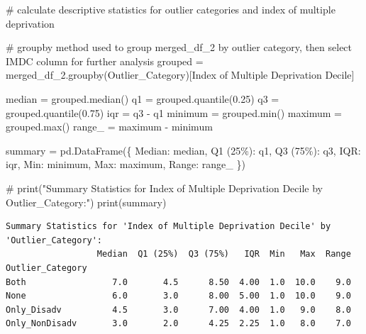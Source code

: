 \documentclass[
  letterpaper,
  DIV=11,
  numbers=noendperiod]{scrartcl}
\newenvironment{Shaded}{\begin{snugshade}}{\end{snugshade}}
\newcommand{\BuiltInTok}[1]{\textcolor[rgb]{0.00,0.23,0.31}{#1}}
\newcommand{\CommentTok}[1]{\textcolor[rgb]{0.37,0.37,0.37}{#1}}
\newcommand{\FloatTok}[1]{\textcolor[rgb]{0.68,0.00,0.00}{#1}}
\newcommand{\NormalTok}[1]{\textcolor[rgb]{0.00,0.23,0.31}{#1}}
\newcommand{\OperatorTok}[1]{\textcolor[rgb]{0.37,0.37,0.37}{#1}}
\newcommand{\StringTok}[1]{\textcolor[rgb]{0.13,0.47,0.30}{#1}}
\begin{document}
\begin{Shaded}
\begin{Highlighting}[]
\CommentTok{\#  calculate descriptive statistics for outlier categories and index of multiple deprivation}

\CommentTok{\# groupby method used to group merged\_df\_2 by outlier category, then select IMDC column for further analysis}
\NormalTok{grouped }\OperatorTok{=}\NormalTok{ merged\_df\_2.groupby(}\StringTok{\textquotesingle{}Outlier\_Category\textquotesingle{}}\NormalTok{)[}\StringTok{\textquotesingle{}Index of Multiple Deprivation Decile\textquotesingle{}}\NormalTok{]}


\NormalTok{median }\OperatorTok{=}\NormalTok{ grouped.median()}
\NormalTok{q1 }\OperatorTok{=}\NormalTok{ grouped.quantile(}\FloatTok{0.25}\NormalTok{)}
\NormalTok{q3 }\OperatorTok{=}\NormalTok{ grouped.quantile(}\FloatTok{0.75}\NormalTok{)}
\NormalTok{iqr }\OperatorTok{=}\NormalTok{ q3 }\OperatorTok{{-}}\NormalTok{ q1}
\NormalTok{minimum }\OperatorTok{=}\NormalTok{ grouped.}\BuiltInTok{min}\NormalTok{()}
\NormalTok{maximum }\OperatorTok{=}\NormalTok{ grouped.}\BuiltInTok{max}\NormalTok{()}
\NormalTok{range\_ }\OperatorTok{=}\NormalTok{ maximum }\OperatorTok{{-}}\NormalTok{ minimum}


\NormalTok{summary }\OperatorTok{=}\NormalTok{ pd.DataFrame(\{}
    \StringTok{\textquotesingle{}Median\textquotesingle{}}\NormalTok{: median,}
    \StringTok{\textquotesingle{}Q1 (25\%)\textquotesingle{}}\NormalTok{: q1,}
    \StringTok{\textquotesingle{}Q3 (75\%)\textquotesingle{}}\NormalTok{: q3,}
    \StringTok{\textquotesingle{}IQR\textquotesingle{}}\NormalTok{: iqr,}
    \StringTok{\textquotesingle{}Min\textquotesingle{}}\NormalTok{: minimum,}
    \StringTok{\textquotesingle{}Max\textquotesingle{}}\NormalTok{: maximum,}
    \StringTok{\textquotesingle{}Range\textquotesingle{}}\NormalTok{: range\_}
\NormalTok{\})}

\CommentTok{\# }
\BuiltInTok{print}\NormalTok{(}\StringTok{"Summary Statistics for \textquotesingle{}Index of Multiple Deprivation Decile\textquotesingle{} by \textquotesingle{}Outlier\_Category\textquotesingle{}:"}\NormalTok{)}
\BuiltInTok{print}\NormalTok{(summary)}
\end{Highlighting}
\end{Shaded}

\begin{verbatim}
Summary Statistics for 'Index of Multiple Deprivation Decile' by 'Outlier_Category':
                  Median  Q1 (25%)  Q3 (75%)   IQR  Min   Max  Range
Outlier_Category                                                    
Both                 7.0       4.5      8.50  4.00  1.0  10.0    9.0
None                 6.0       3.0      8.00  5.00  1.0  10.0    9.0
Only_Disadv          4.5       3.0      7.00  4.00  1.0   9.0    8.0
Only_NonDisadv       3.0       2.0      4.25  2.25  1.0   8.0    7.0
\end{verbatim}
\end{document}
